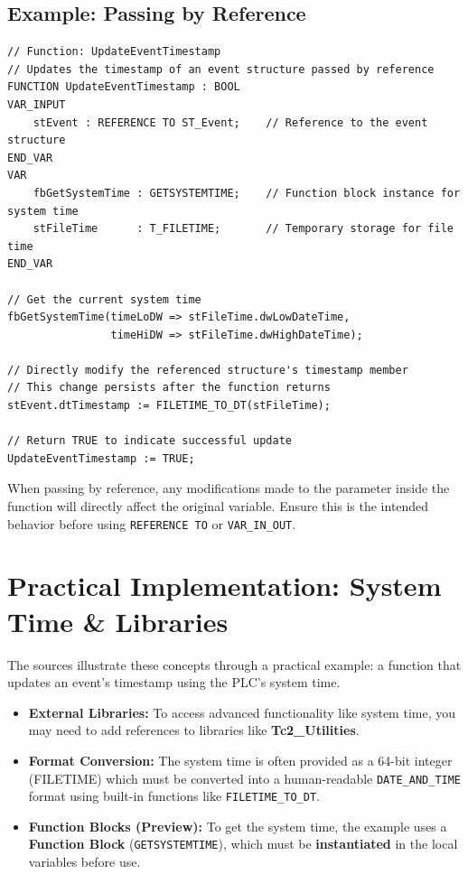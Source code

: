\documentclass[11pt,a4paper]{article}
\begin{document}
\subsection*{Example: Passing by Reference}

\begin{lstlisting}
// Function: UpdateEventTimestamp
// Updates the timestamp of an event structure passed by reference
FUNCTION UpdateEventTimestamp : BOOL
VAR_INPUT
    stEvent : REFERENCE TO ST_Event;    // Reference to the event structure
END_VAR
VAR
    fbGetSystemTime : GETSYSTEMTIME;    // Function block instance for system time
    stFileTime      : T_FILETIME;       // Temporary storage for file time
END_VAR

// Get the current system time
fbGetSystemTime(timeLoDW => stFileTime.dwLowDateTime,
                timeHiDW => stFileTime.dwHighDateTime);

// Directly modify the referenced structure's timestamp member
// This change persists after the function returns
stEvent.dtTimestamp := FILETIME_TO_DT(stFileTime);

// Return TRUE to indicate successful update
UpdateEventTimestamp := TRUE;
\end{lstlisting}

\begin{warningbox}
When passing by reference, any modifications made to the parameter inside the function will directly affect the original variable. Ensure this is the intended behavior before using \texttt{REFERENCE TO} or \texttt{VAR\_IN\_OUT}.
\end{warningbox}

\section{Practical Implementation: System Time \& Libraries}

The sources illustrate these concepts through a practical example: a function that updates an event's timestamp using the PLC's system time.

\begin{itemize}[leftmargin=*]
    \item \textbf{External Libraries:} To access advanced functionality like system time, you may need to add references to libraries like \textbf{Tc2\_Utilities}.
    
    \item \textbf{Format Conversion:} The system time is often provided as a 64-bit integer (FILETIME) which must be converted into a human-readable \texttt{DATE\_AND\_TIME} format using built-in functions like \texttt{FILETIME\_TO\_DT}.
    
    \item \textbf{Function Blocks (Preview):} To get the system time, the example uses a \textbf{Function Block} (\texttt{GETSYSTEMTIME}), which must be \textbf{instantiated} in the local variables before use.
\end{itemize}
\end{document}
